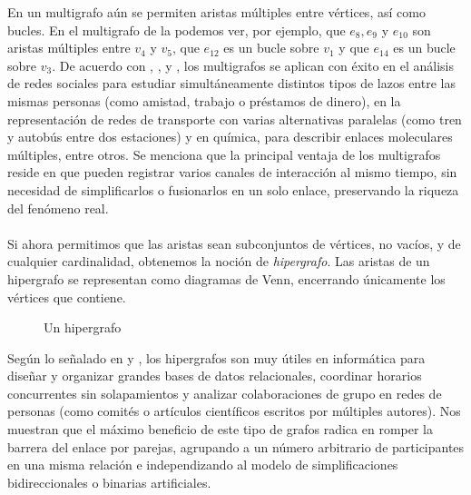 En un multigrafo aún se permiten aristas múltiples entre vértices, así como bucles. En el multigrafo de la  podemos ver, por ejemplo, que $e_8,e_9$ y $e_{10}$ son aristas múltiples entre $v_4$ y $v_5$, que $e_{12}$ es un bucle sobre $v_1$ y que $e_{14}$ es un bucle sobre $v_3$. De acuerdo con \cite{Andrei2008}, \cite{Butler2023}, \cite{Gross2006} y \cite{Shafie2012}, los multigrafos se aplican con éxito en el análisis de redes sociales para estudiar simultáneamente distintos tipos de lazos entre las mismas personas (como amistad, trabajo o préstamos de dinero), en la representación de redes de transporte con varias alternativas paralelas (como tren y autobús entre dos estaciones) y en química, para describir enlaces moleculares múltiples, entre otros. Se menciona que la principal ventaja de los multigrafos reside en que pueden registrar varios canales de interacción al mismo tiempo, sin necesidad de simplificarlos o fusionarlos en un solo enlace, preservando la riqueza del fenómeno real.\\\\
Si ahora permitimos que las aristas sean subconjuntos de vértices, no vacíos, y de cualquier cardinalidad, obtenemos la noción de \textit{hipergrafo}. Las aristas de un hipergrafo se representan como diagramas de Venn, encerrando únicamente los vértices que contiene.
\begin{figure}[H]
  \centering
    \resizebox{0.6\textwidth}{!}{} 
  \caption{Un hipergrafo}
\end{figure}
Según lo señalado en \cite{Bretto2013} y \cite{Molnar2014}, los hipergrafos son muy útiles en informática para diseñar y organizar grandes bases de datos relacionales, coordinar horarios concurrentes sin solapamientos y analizar colaboraciones de grupo en redes de personas (como comités o artículos científicos escritos por múltiples autores). Nos muestran que el máximo beneficio de este tipo de grafos radica en romper la barrera del enlace por parejas, agrupando a un número arbitrario de participantes en una misma relación e independizando al modelo de simplificaciones bidireccionales o binarias artificiales.
